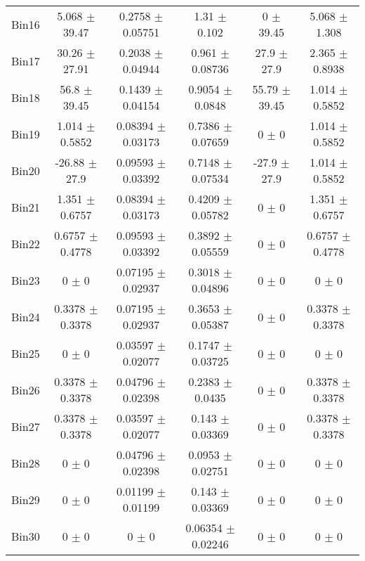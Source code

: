 \begin{tabular}{@{\extracolsep{4pt}}lccccc@{}}
     Bin16 & 5.068 $\pm$ 39.47 & 0.2758 $\pm$ 0.05751 & 1.31 $\pm$ 0.102 & 0 $\pm$ 39.45 & 5.068 $\pm$ 1.308 \\ 
     Bin17 & 30.26 $\pm$ 27.91 & 0.2038 $\pm$ 0.04944 & 0.961 $\pm$ 0.08736 & 27.9 $\pm$ 27.9 & 2.365 $\pm$ 0.8938 \\ 
     Bin18 & 56.8 $\pm$ 39.45 & 0.1439 $\pm$ 0.04154 & 0.9054 $\pm$ 0.0848 & 55.79 $\pm$ 39.45 & 1.014 $\pm$ 0.5852 \\ 
     Bin19 & 1.014 $\pm$ 0.5852 & 0.08394 $\pm$ 0.03173 & 0.7386 $\pm$ 0.07659 & 0 $\pm$ 0 & 1.014 $\pm$ 0.5852 \\ 
     Bin20 & -26.88 $\pm$ 27.9 & 0.09593 $\pm$ 0.03392 & 0.7148 $\pm$ 0.07534 & -27.9 $\pm$ 27.9 & 1.014 $\pm$ 0.5852 \\ 
     Bin21 & 1.351 $\pm$ 0.6757 & 0.08394 $\pm$ 0.03173 & 0.4209 $\pm$ 0.05782 & 0 $\pm$ 0 & 1.351 $\pm$ 0.6757 \\ 
     Bin22 & 0.6757 $\pm$ 0.4778 & 0.09593 $\pm$ 0.03392 & 0.3892 $\pm$ 0.05559 & 0 $\pm$ 0 & 0.6757 $\pm$ 0.4778 \\ 
     Bin23 & 0 $\pm$ 0 & 0.07195 $\pm$ 0.02937 & 0.3018 $\pm$ 0.04896 & 0 $\pm$ 0 & 0 $\pm$ 0 \\ 
     Bin24 & 0.3378 $\pm$ 0.3378 & 0.07195 $\pm$ 0.02937 & 0.3653 $\pm$ 0.05387 & 0 $\pm$ 0 & 0.3378 $\pm$ 0.3378 \\ 
     Bin25 & 0 $\pm$ 0 & 0.03597 $\pm$ 0.02077 & 0.1747 $\pm$ 0.03725 & 0 $\pm$ 0 & 0 $\pm$ 0 \\ 
     Bin26 & 0.3378 $\pm$ 0.3378 & 0.04796 $\pm$ 0.02398 & 0.2383 $\pm$ 0.0435 & 0 $\pm$ 0 & 0.3378 $\pm$ 0.3378 \\ 
     Bin27 & 0.3378 $\pm$ 0.3378 & 0.03597 $\pm$ 0.02077 & 0.143 $\pm$ 0.03369 & 0 $\pm$ 0 & 0.3378 $\pm$ 0.3378 \\ 
     Bin28 & 0 $\pm$ 0 & 0.04796 $\pm$ 0.02398 & 0.0953 $\pm$ 0.02751 & 0 $\pm$ 0 & 0 $\pm$ 0 \\ 
     Bin29 & 0 $\pm$ 0 & 0.01199 $\pm$ 0.01199 & 0.143 $\pm$ 0.03369 & 0 $\pm$ 0 & 0 $\pm$ 0 \\ 
     Bin30 & 0 $\pm$ 0 & 0 $\pm$ 0 & 0.06354 $\pm$ 0.02246 & 0 $\pm$ 0 & 0 $\pm$ 0 \\ 
\hline\hline
  \end{tabular}
